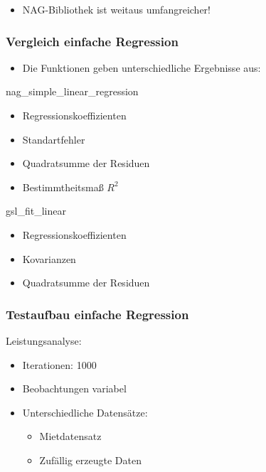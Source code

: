 \documentclass{beamer}
\begin{document}
\begin{frame}
  \pause\pause\pause\pause\pause\pause

  \begin{itemize}
  \item NAG-Bibliothek ist weitaus umfangreicher! 
  \end{itemize}

\end{frame}

\begin{frame}
  \frametitle{Vergleich einfache Regression}
  
  \begin{itemize}
  \item Die Funktionen geben unterschiedliche Ergebnisse aus:
  \end{itemize}

  \begin{block}{nag\_simple\_linear\_regression}
    \begin{itemize}
    \item Regressionskoeffizienten
    \item Standartfehler
    \item Quadratsumme der Residuen
    \item Bestimmtheitsmaß $R^2$
    \end{itemize}
  \end{block}

  \begin{block}{gsl\_fit\_linear}
    \begin{itemize}
    \item Regressionskoeffizienten
    \item Kovarianzen
    \item Quadratsumme der Residuen
    \end{itemize}
  \end{block}

\end{frame}

\begin{frame}
  \frametitle{Testaufbau einfache Regression}

  \begin{block}{Leistungsanalyse:}
    \begin{itemize}
    \item Iterationen: 1000
    \item Beobachtungen variabel
    \item Unterschiedliche Datensätze:
      \begin{itemize}
      \item Mietdatensatz
      \item Zufällig erzeugte Daten
      \end{itemize}
    \end{itemize}
  \end{block}

\end{frame}
\end{document}
